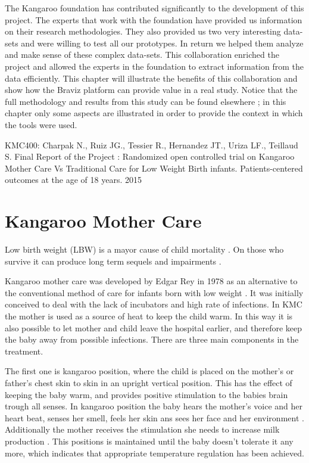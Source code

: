 \label{chap_kmc400}



The Kangaroo foundation has contributed significantly to the development of this project. The experts that work with the foundation have provided us information on their research methodologies. They also provided us two very interesting data-sets and were willing to test all our prototypes. In return we helped them analyze and make sense of these complex data-sets. This collaboration enriched the project and allowed the experts in the foundation to extract information from the data efficiently. This chapter will illustrate the benefits of this collaboration and show how the Braviz platform can provide value in a real study. Notice that the full methodology and results from this study can be found elsewhere \autocite{KMC400}; in this chapter only some aspects are illustrated in order to provide the context in which the tools were used.

KMC400: 
Charpak N., Ruiz JG., Tessier R., Hernandez JT., Uriza LF., Teillaud S. Final Report of the Project : Randomized open controlled trial on Kangaroo Mother Care Vs Traditional Care for Low Weight Birth infants. Patients-centered outcomes at the age of 18 years. 2015

\section{Kangaroo Mother Care}

Low birth weight (LBW) is a mayor cause of child mortality \autocite{wardlaw_low_2005}. On those who survive it can produce long term sequels and impairments \autocite{nosarti_neurodevelopmental_2010}. 

Kangaroo mother care was developed by Edgar Rey in 1978 \autocite{rey_rational_1983} as an alternative to the conventional method of care for infants born with low weight \autocite{conde-agudelo_kangaroo_2003}. It was initially conceived to deal with the lack of incubators and high rate of infections. In KMC the mother is used as a source of heat to keep the child warm. In this way it is also possible to let mother and child leave the hospital earlier, and therefore keep the baby away from possible infections. There are three main components in the treatment.

The first one is kangaroo position, where the child is placed on the mother's or father's chest skin to skin in an upright vertical position. This has the effect  of keeping the baby warm, and provides positive stimulation to the babies brain trough all senses. In kangaroo position the baby hears the mother's voice and her heart beat, senses her smell, feels her skin ans sees her face and her environment \autocite{tessier_kangaroo_2003}. Additionally the mother receives the stimulation she needs to increase milk production \autocite{charpak_kangaroo_2005}. This positions is maintained until the baby doesn't tolerate it any more, which indicates that appropriate temperature regulation has been achieved. 

